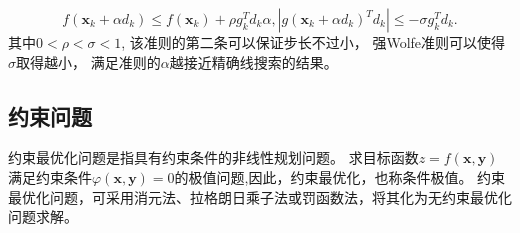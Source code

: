 \begin{definition}[强Wolfe准则]
    \begin{equation}
        f(\bm{x}_k+\alpha d_k) \leq f(\bm{x}_k) + \rho g_k^Td_k\alpha,
        |g(\bm{x}_k+\alpha d_k)^Td_k| \leq -\sigma g_k^Td_k.
    \end{equation}其中$0 < \rho < \sigma < 1$, 该准则的第二条可以保证步长不过小，
    强Wolfe准则可以使得$\sigma$取得越小，
    满足准则的$\alpha$越接近精确线搜索的结果。
\end{definition}

\subsection{约束问题}

约束最优化问题是指具有约束条件的非线性规划问题。
求目标函数$z = f(\bm{x},\bm{y})$满足约束条件$\varphi(\bm{x},\bm{y}) = 0$的极值问题,因此，约束最优化，也称条件极值。
约束最优化问题，可采用消元法、拉格朗日乘子法或罚函数法，将其化为无约束最优化问题求解。

